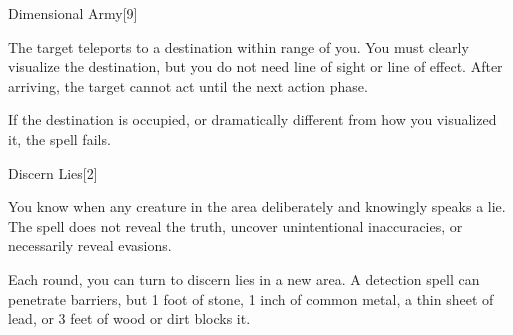 \begin{spellsection}{Dimensional Army}[9]
    \begin{spellheader}
    \end{spellheader}
    \begin{spellcontent}
        \begin{spelltargetinginfo}
        \end{spelltargetinginfo}
        \begin{spelleffects}
            \spelleffect The target teleports to a destination within \rngext range of you. You must clearly visualize the destination, but you do not need line of sight or line of effect. After arriving, the target cannot act until the next action phase.

            If the destination is occupied, or dramatically different from how you visualized it, the spell fails.
        \end{spelleffects}
    \end{spellcontent}
    \begin{spellfooter}
        \miscastexplode
    \end{spellfooter}
\end{spellsection}

\begin{spellsection}{Discern Lies}[2]
    \begin{spellheader}
    \end{spellheader}
    \begin{spellcontent}
        \begin{spelltargetinginfo}
        \end{spelltargetinginfo}
        \begin{spelleffects}
            \spelleffect You know when any creature in the area deliberately and knowingly speaks a lie. The spell does not reveal the truth, uncover unintentional inaccuracies, or necessarily reveal evasions.
            \spelldur \durshort
        \end{spelleffects}
    \end{spellcontent}
    \begin{spellfooter}
        \spellnotes Each round, you can turn to discern lies in a new area. A detection spell can penetrate barriers, but 1 foot of stone, 1 inch of common metal, a thin sheet of lead, or 3 feet of wood or dirt blocks it.
        \miscastexplode
    \end{spellfooter}
    \begin{spellaugments}
    \end{spellaugments}
\end{spellsection}

